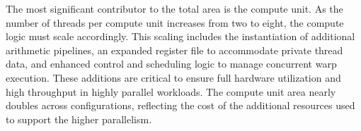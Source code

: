             The most significant contributor to the total area is the compute unit. As the number of threads per compute unit increases from two to eight, the compute logic must scale accordingly. This scaling includes the instantiation of additional arithmetic pipelines, an expanded register file to accommodate private thread data, and enhanced control and scheduling logic to manage concurrent warp execution. These additions are critical to ensure full hardware utilization and high throughput in highly parallel workloads. The compute unit area nearly doubles across configurations, reflecting the cost of the additional resources used to support the higher parallelism.

            \begin{table}[tp]
                \caption{Area and leakage breakdown across accelerator configurations with percentage contribution to total.}
                \label{tbl:area_leakage}
                \centering
\end{table}
